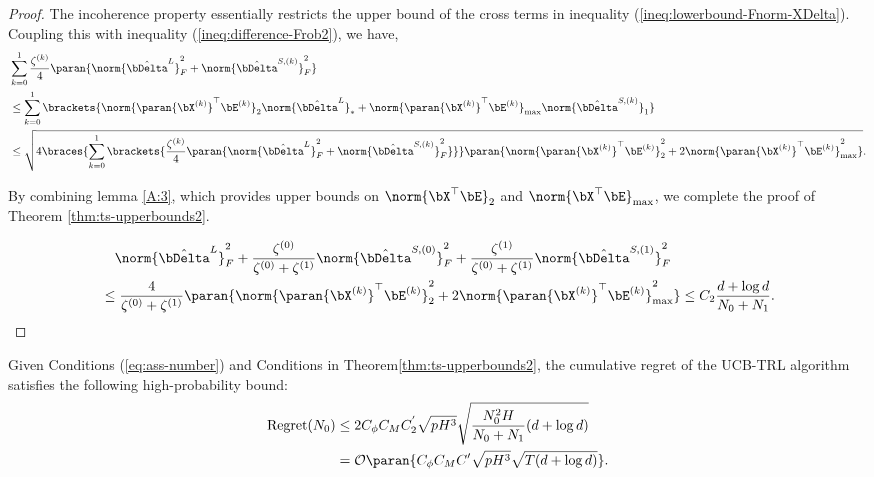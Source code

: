 \begin{proof}
     The incoherence property essentially restricts the upper bound of the cross terms in inequality (\ref{ineq:lowerbound-Fnorm-XDelta}). Coupling this with inequality (\ref{ineq:difference-Frob2}), we have,
     \begin{equation}
     \begin{aligned}
      &\sum_{k=0}^1 \frac{\zeta^{(k)}}{4} \paran{ \norm{\hat\bDelta^L}_F^2 + \norm{\hat\bDelta^{S, (k)}}_F^2 }\\
      &\leq \sum_{k=0}^1 \brackets{\norm{\paran{\bX^{(k)}}^\top \bE^{(k)}}_2\norm{\hat\bDelta^L}_* + \norm{\paran{\bX^{(k)}}^\top \bE^{(k)}}_{\max}\norm{\hat\bDelta^{S, (k)}}_1}\\
      &\leq \sqrt{4\braces{\sum_{k=0}^1\brackets{\frac{\zeta^{(k)}}{4} \paran{\norm{\hat\bDelta^L}_F^2 + \norm{\hat\bDelta^{S, (k)}}_F^2}}}\paran{\norm{\paran{\bX^{(k)}}^\top \bE^{(k)}}_2^2+2\norm{\paran{\bX^{(k)}}^\top \bE^{(k)}}_{\max}^2}}.
     \end{aligned}
     \end{equation}
     
     By combining lemma \ref{A:3}, which provides upper bounds on 
    $\norm{\bX^{\top}\bE}_2$ and $\norm{\bX^{\top}\bE}_{\max}$, we complete the proof of Theorem \ref{thm:ts-upperbounds2}.

     \begin{equation}
     \begin{aligned}
	 &\quad\norm{\hat\bDelta^L}_F^2+\dfrac{\zeta^{(0)}}{\zeta^{(0)}+ \zeta^{(1)}}\norm{\hat\bDelta^{S, (0)}}_F^2+\dfrac{\zeta^{(1)}}{\zeta^{(0)}+ \zeta^{(1)}}\norm{\hat\bDelta^{S, (1)}}_F^2\\
     &\leq \frac{4}{\zeta^{(0)}+\zeta^{(1)}}\paran{\norm{\paran{\bX^{(k)}}^\top \bE^{(k)}}_2^2+2\norm{\paran{\bX^{(k)}}^\top \bE^{(k)}}_{\max}^2}
     \leq C_2\frac{d+\log d}{N_0+N_1}.
     \end{aligned}
     \end{equation}

   \end{proof}
   \begin{theorem}
   Given Conditions (\ref{eq:ass-number}) and Conditions in Theorem\ref{thm:ts-upperbounds2}, the cumulative regret of the UCB-TRL algorithm satisfies the following high-probability bound:
    \begin{align*}
    \text{Regret}(N_0)&  \leq 2C_{\phi}C_{M}C_2^{'} \sqrt{pH^3}\sqrt{\frac{N_0^2H}{N_0+N_1}(d+\log d)}\\
    & =\mathcal{O}\paran{C_{\phi}C_{M}C' \sqrt{pH^3}\sqrt{T(d+\log d)}}.
   \end{align*} 
   \end{theorem}


